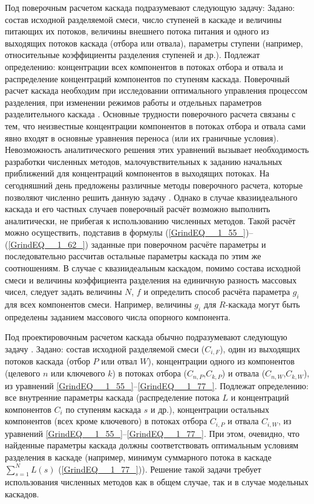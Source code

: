 Под поверочным расчетом каскада подразумевают следующую задачу:
Задано: состав исходной разделяемой смеси, число ступеней в каскаде и величины питающих их потоков, величины внешнего потока питания и одного из выходящих потоков каскада (отбора или отвала), параметры ступени (например, относительные коэффициенты разделения ступеней и др.).
Подлежат определению: концентрации всех компонентов в потоках отбора и отвала и распределение концентраций компонентов по ступеням каскада. 
Поверочный расчет каскада необходим при исследовании оптимального управления процессом разделения, при изменении режимов работы и отдельных параметров разделительного каскада \cite{sulaberidzeTeoriyaKaskadovDlya2011}. Основные трудности поверочного расчета связаны с тем, что неизвестные концентрации компонентов в потоках отбора и отвала сами явно входят в основные уравнения переноса (или их граничные условия). Невозможность аналитического решения этих уравнений вызывает необходимость разработки численных методов, малочувствительных к заданию начальных приближений для концентраций компонентов в выходящих потоках. На сегодняшний день предложены различные методы поверочного расчета, которые позволяют численно решить данную задачу \cite{sulaberidzeTeoriyaKaskadovDlya2011, sazykinUsovershenstvovannyyMetodRascheta1997, wuCalculationMethodsDetermining1988, holpanovEffektivnyyMetodRascheta1998, potapovCalculationSquaredoffCascades1996, zengRobustEfficientCalculation2000}.
Однако в случае квазиидеального каскада и его частных случаев поверочный расчёт возможно выполнить аналитически, не прибегая к использованию численных методов. Такой расчёт можно осуществить, подставив в формулы (\ref{GrindEQ__1_55_})--(\ref{GrindEQ__1_62_}) заданные при поверочном расчёте параметры и последовательно рассчитав остальные параметры каскада по этим же соотношениям. В случае с квазиидеальным каскадом, помимо состава исходной смеси и величины коэффициента разделения на единичную разность массовых чисел, следует задать величины $N$, $f$ и определить способ расчёта параметра $g_{i}$ для всех компонентов смеси. Например, величины $g_{i}$ для $R$-каскада могут быть определены заданием массового числа опорного компонента.  

Под проектировочным расчетом каскада обычно подразумевают следующую задачу \cite{sulaberidzeTeoriyaKaskadovDlya2011}.
Задано: состав исходной разделяемой смеси ($C_{i,F}$), один из выходящих потоков каскада (отбор $P$ или отвал $W$), концентрации одного из компонентов (целевого $n$ или ключевого $k$) в потоках отбора ($C_{n,P}$,$C_{k,P}$) и отвала ($C_{n,W}$,$C_{k,W}$), из уравнений \ref{GrindEQ__1_55_}--\ref{GrindEQ__1_77_}.
Подлежат определению: все внутренние параметры каскада (распределение потока $L$ и концентраций компонентов $C_{i}$ по ступеням каскада $s$ и др.), концентрации остальных компонентов (всех кроме ключевого) в потоках отбора $C_{i,P}$ и отвала $C_{i,W}$, из уравнений \ref{GrindEQ__1_55_}--\ref{GrindEQ__1_77_}. 
При этом, очевидно, что найденные параметры каскада должны соответствовать оптимальным условиям разделения в каскаде (например, минимум суммарного потока в каскаде $\sum _{s=1}^{N}L(s)$ (\ref{GrindEQ__1_77_})). Решение такой задачи требует использования численных методов как в общем случае, так и в случае модельных каскадов. 

